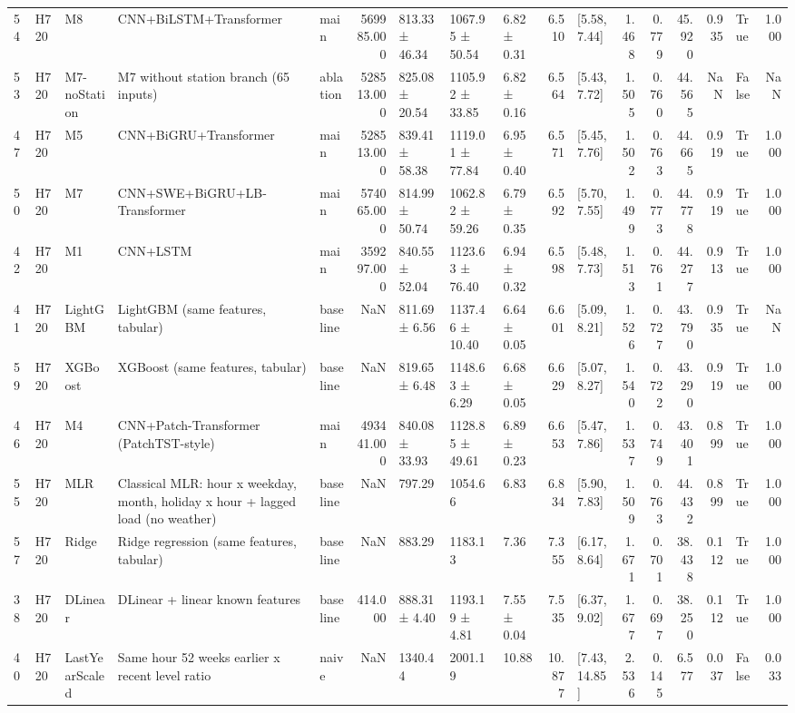 \begin{tabular}{lllllrlllrlrrrrlr}
54 & H720 & M8 & CNN+BiLSTM+Transformer & main & 569985.000 & 813.33 ± 46.34 & 1067.95 ± 50.54 & 6.82 ± 0.31 & 6.510 & [5.58, 7.44] & 1.468 & 0.779 & 45.920 & 0.935 & True & 1.000 \\
53 & H720 & M7-noStation & M7 without station branch (65 inputs) & ablation & 528513.000 & 825.08 ± 20.54 & 1105.92 ± 33.85 & 6.82 ± 0.16 & 6.564 & [5.43, 7.72] & 1.505 & 0.760 & 44.565 & NaN & False & NaN \\
47 & H720 & M5 & CNN+BiGRU+Transformer & main & 528513.000 & 839.41 ± 58.38 & 1119.01 ± 77.84 & 6.95 ± 0.40 & 6.571 & [5.45, 7.76] & 1.502 & 0.763 & 44.665 & 0.919 & True & 1.000 \\
50 & H720 & M7 & CNN+SWE+BiGRU+LB-Transformer & main & 574065.000 & 814.99 ± 50.74 & 1062.82 ± 59.26 & 6.79 ± 0.35 & 6.592 & [5.70, 7.55] & 1.499 & 0.773 & 44.778 & 0.919 & True & 1.000 \\
42 & H720 & M1 & CNN+LSTM & main & 359297.000 & 840.55 ± 52.04 & 1123.63 ± 76.40 & 6.94 ± 0.32 & 6.598 & [5.48, 7.73] & 1.513 & 0.761 & 44.277 & 0.913 & True & 1.000 \\
41 & H720 & LightGBM & LightGBM (same features, tabular) & baseline & NaN & 811.69 ± 6.56 & 1137.46 ± 10.40 & 6.64 ± 0.05 & 6.601 & [5.09, 8.21] & 1.526 & 0.727 & 43.790 & 0.935 & True & NaN \\
59 & H720 & XGBoost & XGBoost (same features, tabular) & baseline & NaN & 819.65 ± 6.48 & 1148.63 ± 6.29 & 6.68 ± 0.05 & 6.629 & [5.07, 8.27] & 1.540 & 0.722 & 43.290 & 0.919 & True & 1.000 \\
46 & H720 & M4 & CNN+Patch-Transformer (PatchTST-style) & main & 493441.000 & 840.08 ± 33.93 & 1128.85 ± 49.61 & 6.89 ± 0.23 & 6.653 & [5.47, 7.86] & 1.537 & 0.749 & 43.401 & 0.899 & True & 1.000 \\
55 & H720 & MLR & Classical MLR: hour x weekday, month, holiday x hour + lagged load (no weather) & baseline & NaN & 797.29 & 1054.66 & 6.83 & 6.834 & [5.90, 7.83] & 1.509 & 0.763 & 44.432 & 0.899 & True & 1.000 \\
57 & H720 & Ridge & Ridge regression (same features, tabular) & baseline & NaN & 883.29 & 1183.13 & 7.36 & 7.355 & [6.17, 8.64] & 1.671 & 0.701 & 38.438 & 0.112 & True & 1.000 \\
38 & H720 & DLinear & DLinear + linear known features & baseline & 414.000 & 888.31 ± 4.40 & 1193.19 ± 4.81 & 7.55 ± 0.04 & 7.535 & [6.37, 9.02] & 1.677 & 0.697 & 38.250 & 0.112 & True & 1.000 \\
40 & H720 & LastYearScaled & Same hour 52 weeks earlier x recent level ratio & naive & NaN & 1340.44 & 2001.19 & 10.88 & 10.877 & [7.43, 14.85] & 2.536 & 0.145 & 6.577 & 0.037 & False & 0.033 \\

\end{tabular}
